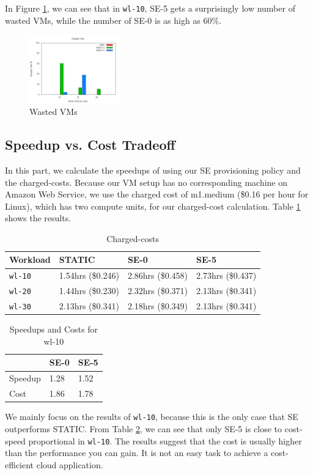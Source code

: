 In Figure \ref{figure_vm_wasted}, we can see that in \texttt{wl-10}, SE-5 gets a surprisingly low number of wasted VMs, while the number of SE-0 is as high as 60\%.

\begin{figure}[!t]
\centering
\includegraphics[width=0.35\textwidth]{pictures/vm-wasted.png}
\caption{Wasted VMs}
\label{figure_vm_wasted}
\end{figure}


\subsection{Speedup vs. Cost Tradeoff}
In this part, we calculate the speedups of using our SE provisioning policy and the charged-costs. Because our VM setup has no corresponding machine on Amazon Web Service, we use the charged cost of m1.medium (\$0.16 per hour for Linux), which has two compute units, for our charged-cost calculation. Table \ref{table_chargedcosts} shows the results.

\begin{table}
\caption{Charged-costs}
\label{table_chargedcosts}
\centering
\begin{tabular}{|l|l|l|l|}
\hline
Workload & STATIC & SE-0 & SE-5 \\
\hline
\texttt{wl-10} & 1.54hrs (\$0.246) & 2.86hrs (\$0.458) & 2.73hrs (\$0.437) \\
\hline
\texttt{wl-20} & 1.44hrs (\$0.230) & 2.32hrs (\$0.371) & 2.13hrs (\$0.341) \\
\hline
\texttt{wl-30} & 2.13hrs (\$0.341) & 2.18hrs (\$0.349) & 2.13hrs (\$0.341) \\
\hline
\end{tabular}
\end{table}

\begin{table}
\caption{Speedups and Costs for wl-10}
\label{table_speedupcost}
\centering
\begin{tabular}{|l|l|l|}
\hline
 & SE-0 & SE-5 \\
\hline
Speedup & 1.28 & 1.52 \\
\hline
Cost & 1.86 & 1.78 \\
\hline
\end{tabular}
\end{table}

We mainly focus on the results of \texttt{wl-10}, because this is the only case that SE outperforms STATIC. From Table \ref{table_speedupcost}, we can see that only SE-5 is close to cost-speed proportional in \texttt{wl-10}. The results suggest that the cost is usually higher than the performance you can gain. It is not an easy task to achieve a cost-efficient cloud application.
